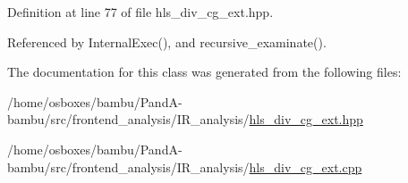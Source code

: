 Definition at line 77 of file hls\+\_\+div\+\_\+cg\+\_\+ext.\+hpp.



Referenced by Internal\+Exec(), and recursive\+\_\+examinate().



The documentation for this class was generated from the following files\+:\begin{DoxyCompactItemize}
\item 
/home/osboxes/bambu/\+Pand\+A-\/bambu/src/frontend\+\_\+analysis/\+I\+R\+\_\+analysis/\hyperlink{hls__div__cg__ext_8hpp}{hls\+\_\+div\+\_\+cg\+\_\+ext.\+hpp}\item 
/home/osboxes/bambu/\+Pand\+A-\/bambu/src/frontend\+\_\+analysis/\+I\+R\+\_\+analysis/\hyperlink{hls__div__cg__ext_8cpp}{hls\+\_\+div\+\_\+cg\+\_\+ext.\+cpp}\end{DoxyCompactItemize}
